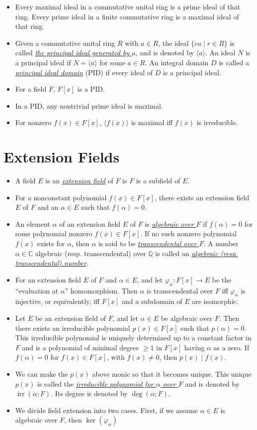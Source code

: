 \documentclass{article}
\newcommand{\df}[1]{\ul{\textit{#1}}}
\newcommand{\Q}{\mathbb{Q}}
\newcommand{\C}{\mathbb{C}}
\newcommand{\la}{\langle}
\newcommand{\ra}{\rangle}
\newcommand{\ga}{\langle a \rangle}
\newcommand{\irr}{\operatorname{irr}}
\renewcommand{\phi}{\varphi}
\begin{document}
\begin{itemize}
    \item Every maximal ideal in a commutative unital ring is a prime ideal of that ring. Every prime ideal in a finite commutative ring is a maximal ideal of that ring.
    \item Given a commutative unital ring $R$ with $a \in R$, the ideal $\{ra \mid r \in R\}$ is called \df{the principal ideal generated by $a$}, and is denoted by $\ga$. An ideal $N$ is a principal ideal if $N = \ga$ for some $a \in R$. An integral domain $D$ is called a \df{principal ideal domain} (PID) if every ideal of $D$ is a principal ideal.
    \item For a field $F$, $F[x]$ is a PID.
    \item In a PID, any nontrivial prime ideal is maximal.
    \item For nonzero $f(x) \in F[x]$, $\la f(x) \ra$ is maximal iff $f(x)$ is irreducible.
\end{itemize}

\section{Extension Fields}
\begin{itemize}
    \item A field $E$ is an \df{extension field} of $F$ is $F$ is a subfield of $E$.
    \item For a nonconstant polynomial $f(x) \in F[x]$, there exists an extension field $E$ of $F$ and an $\alpha \in E$ such that $f(\alpha) = 0$.
    \item An element $\alpha$ of an extension field $E$ of $F$ is \df{algebraic over $F$} if $f(\alpha) = 0$ for some polynomial nonzero $f(x) \in F[x]$. If no such nonzero polynomial $f(x)$ exists for $\alpha$, then $\alpha$ is said to be \df{transcendental over $F$}. A number $\alpha \in \C$ algebraic (resp.{} transcendental) over $\Q$ is called an \df{algebraic (resp.{} transcendental) number}.
    \item For an extension field $E$ of $F$ and $\alpha \in E$, and let $\phi_\alpha: F[x] \to E$ be the ``evaluation at $\alpha$'' homomorphism. Then $\alpha$ is transcendental over $F$ iff $\phi_\alpha$ is injective, or equivalently, iff $F[x]$ and a subdomain of $E$ are isomorphic.
    \item Let $E$ be an extension field of $F$, and let $\alpha \in E$ be algebraic over $F$. Then there exists an irreducible polynomial $p(x) \in F[x]$ such that $p(\alpha) = 0$. This irreducible polynomial is uniquely determined up to a constant factor in $F$ and is a polynomial of minimal degree $\geq 1$ in $F[x]$ having $\alpha$ as a zero. If $f(\alpha) = 0$ for $f(x) \in F[x]$, with $f(x) \neq 0$, then $p(x) \mid f(x)$.
    \item We can make the $p(x)$ above monic so that it becomes unique. This unique $p(x)$ is called the \df{irreducible polynomial for $\alpha$ over $F$} and is denoted by $\irr(\alpha;F)$. Its degree is denoted by $\deg(\alpha;F)$.
    \item We divide field extension into two cases. First, if we assume $\alpha \in E$ is algebraic over $F$, then $\ker(\phi_\alpha)$ 
    
    
\end{itemize}
\end{document}
